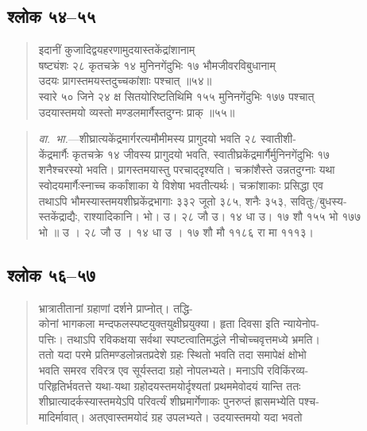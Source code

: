 \documentclass[11pt,a4paper]{article}
\newcommand{\dev}[1]{{\devanagarifont #1}}
\newenvironment{shloka}{%
  \begin{quote}
  \small
  \setlength{\leftmargin}{2em}
  \devanagarifont
}{\end{quote}}
\newenvironment{vyakhya}{%
  \begin{quote}
  \small
  \setlength{\leftmargin}{1em}
  \devanagarifont
}{\end{quote}}
\newcommand{\skt}[1]{{\devanagarifont #1}}
\begin{document}
\subsection{\dev{श्लोक ५४--५५}}

\begin{shloka}
\skt{इदानीं कुजादिद्वयहरणामुदयास्तकेंद्रांशानाम्}\\[0.3em]
\skt{षष्ट्यंशः २८ कृतचक्रे १४ मुनिनगेंदुभिः १७ भौमजीवरविबुधानाम्}\\
\skt{उदयः प्रागस्तमयस्तदुच्चकांशाः पश्चात् ॥५४॥}\\[0.3em]
\skt{स्वारे ५० जिने २४ क्ष सितयोरिष्टतिथिमि १५५ मुनिनगेंदुभिः १७७ पश्चात्}\\
\skt{उदयास्तमयो व्यस्तो मण्डलमार्गैस्तदुग्नः प्राक् ॥५५॥}
\end{shloka}

\begin{vyakhya}
\textit{वा.\ भा.}—\skt{शीघ्रात्यकेंद्रमार्गरत्यमौमीमस्य प्रागुदयो भवति २८ स्वातीशी-}\\
\skt{केंद्रमार्गैः कृतचक्रे १४ जीवस्य प्रागुदयो भवति, स्वातीघ्रकेंद्रमार्गैर्मुनिनगेंदुभिः १७}\\
\skt{शनैश्चरस्यो भवति। प्रागस्तमयास्तु परचाद्‌दृश्यति। चक्रांशैस्ते उन्नतदुग्नाः यथा}\\
\skt{स्वोदयमार्गैःस्नाच्च कर्कांशाका ये विशेषा भवतीत्यर्थः। चक्रांशाकाः प्रसिद्धा एव}\\
\skt{तथाऽपि भौमस्यास्तमयशीघ्रकेंद्रभागाः ३३२ जूतो ३८५, शनैः ३५३, सवितुः/बुधस्य-}\\
\skt{स्तकेंद्राद्यैः, राश्यादिकानि। भो। उ। २८ जौ उ। १४ धा उ। १७ शौ १५५ भो १७७}\\
\skt{भो ॥ उ । २८ जौ उ । १४ धा उ । १७ शौ मौ ११८६ रा मा १११३।}
\end{vyakhya}

\subsection{\dev{श्लोक ५६--५७}}

\begin{shloka}
\skt{भ्रात्रातीतानां ग्रहाणां दर्शने प्राप्नोत्। तद्धि-}\\
\skt{कोनां भागकला मन्दफलस्पष्टयुक्तयुक्षीघ्रयुक्या। हृता दिवसा इति न्यायेनोप-}\\
\skt{पत्तिः। तथाऽपि रविकक्षया सर्वथा स्पष्टत्वातिमद्धंले नीचोच्चवृत्तमध्ये भ्रमति।}\\
\skt{ततो यदा परमे प्रतिमण्डलोन्नतप्रदेशे ग्रहः स्थितो भवति तदा समापेक्षं क्षोभो}\\
\skt{भवति समरव रविरत्र एव सूर्यस्तदा ग्रहो नोपलभ्यते। मनाऽपि रविकिंरव्य-}\\
\skt{परिहृतिर्भवतत्ते यथा-यथा ग्रहोदयस्तमयोर्दृश्यतां प्रथममेवोदयं यान्ति ततः}\\
\skt{शीघ्रात्यादर्कस्यास्तमयेऽपि परिवर्त्यं शीघ्रमार्गेणाकः पुनरुप्तं ह्रासमभ्येति पश्च-}\\
\skt{मादिर्मावात्। अतएवास्तमयोदं ग्रह उपलभ्यते। उदयास्तमयो यदा भवतो}
\end{shloka}
\end{document}
